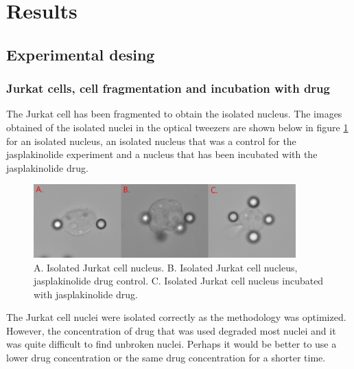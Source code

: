 \documentclass[12pt, a4paper]{article} %
\begin{document}

\section{Results}

\subsection{Experimental desing}

\subsubsection{Jurkat cells, cell fragmentation and incubation with drug}

The Jurkat cell has been fragmented to obtain the isolated nucleus. The images obtained of the isolated nuclei in the optical tweezers are shown below in figure \ref{fig:jurkat_cells} for an isolated nucleus, an isolated nucleus that was a control for the jasplakinolide experiment and a nucleus that has been incubated with the jasplakinolide drug.

\setlength{\parskip}{4mm}

\begin{figure}[htbp]
	\centering
	\includegraphics[width=0.9\textwidth]{figures/jurkat_cell_shape.png}
	\caption{A. Isolated Jurkat cell nucleus. B. Isolated Jurkat cell nucleus, jasplakinolide drug control. C. Isolated Jurkat cell nucleus incubated with jasplakinolide drug.}
	\label{fig:jurkat_cells}
\end{figure}

The Jurkat cell nuclei were isolated correctly as the methodology was optimized. However, the concentration of drug that was used degraded most nuclei and it was quite difficult to find unbroken nuclei. Perhaps it would be better to use a lower drug concentration or the same drug concentration for a shorter time. 
\end{document}
